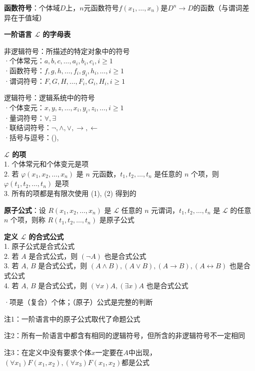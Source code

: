 \textbf{函数符号}：个体域$D$上，$n$元函数符号$f(x_1, \dots, x_n)$是$D^n\rightarrow D$的函数（与谓词差异在于值域）

\textbf{一阶语言 $\mathcal{L}$ 的字母表}

非逻辑符号：所描述的特定对象中的符号\\
·个体常元：$a, b, c, \ldots, a_{i}, b_{i}, c_{i}, i \geq 1$\\
·函数符号：$f, g, h, \ldots, f_{i}, g_{i}, h_{i}, \ldots, i \geq 1$\\
·谓词符号：$F, G, H, \ldots, F_{i}, G_{i}, H_{i}, i \geq 1$
	
逻辑符号：逻辑系统中的符号\\
·个体变元：$x, y, z, \ldots, x_{i}, y_{i}, z_{i}, \ldots, i \geq 1$\\
·量词符号：$\forall, \exists$\\
·联结词符号：$\neg, \land, \vee, \rightarrow, \leftarrow$\\
·括号与逗号：(), \, 

\textbf{$\mathcal{L}$ 的项}\\
1. 个体常元和个体变元是项\\
2. 若 $\varphi (x_{1}, x_{2}, \ldots, x_{n})$ 是 $n$ 元函数，$t_{1}, t_{2}, \ldots, t_{n}$ 是任意的 $n$ 个项，则 $\varphi (t_{1}, t_{2}, \ldots, t_{n})$ 是项\\
3. 所有的项都是有限次使用 (1), (2) 得到的

\textbf{原子公式}：设 $R(x_1, x_2, \ldots, x_n)$ 是 $\mathcal{L}$ 任意的 $n$ 元谓词，$t_1, t_2, \ldots, t_n$ 是 $\mathcal{L}$ 的任意 $n$ 个项，则称 $R(t_1, t_2, \ldots, t_n)$ 是原子公式

\textbf{定义 $\mathcal{L}$ 的合式公式}\\
1. 原子公式是合式公式\\
2. 若 $A$ 是合式公式，则 $(\neg A)$ 也是合式公式\\
3. 若 $A$, $B$ 是合式公式，则 $(A \land B), (A \vee B), (A \rightarrow B), (A \leftrightarrow B)$ 也是合式公式\\
4. 若 $A$, $B$ 是合式公式，则 $(\forall x)A, (\exists x)A$ 也是合式公式

·项是（复合）个体；（原子）公式是完整的判断

注1：一阶语言中的原子公式取代了命题公式

注2：所有一阶语言中都含有相同的逻辑符号，但所含的非逻辑符号不一定相同

注3：在定义中没有要求个体$x$一定要在$A$中出现，$(\forall x_1)F(x_1,x_2),(\forall x_3)F(x_1,x_2)$都是公式


